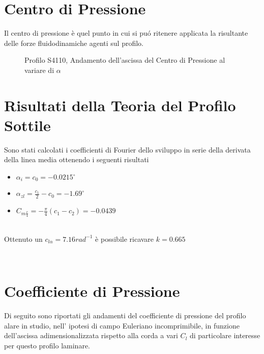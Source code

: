 \section{Centro di Pressione}

Il centro di pressione è quel punto in cui si puó ritenere applicata la risultante delle forze fluidodinamiche agenti sul profilo.\\

\begin{figure} [H]
\centering
{}
\caption{\footnotesize Profilo S4110, Andamento dell'ascissa del Centro di Pressione al variare di ${\alpha}$ }\label{fig:cp}
\end{figure}


\section{Risultati della Teoria del Profilo Sottile}

Sono stati calcolati i coefficienti di Fourier dello sviluppo in serie della derivata della linea media ottenendo i seguenti risultati


\begin {itemize}
\item ${\alpha}_i=c_0=-0.0215^\circ$
\item ${\alpha}_{zl}=\frac {c_1}{2}-c_0=-1.69^\circ$
\item $C_{m\frac {c}{4}}=-\frac {{\pi}}{4}(c_1-c_2)=-0.0439$
\end{itemize}

\noindent \\ 
Ottenuto un $c_{l{\alpha}} = 7.16 rad^{-1}$  è possibile ricavare $ k=0.665$

\noindent \\
\section{Coefficiente di Pressione}

Di seguito sono riportati gli andamenti del coefficiente di pressione del profilo alare in studio, nell’ ipotesi di campo Euleriano incomprimibile, in funzione dell’ascissa adimensionalizzata rispetto alla corda a vari $C_l$ di particolare interesse per questo profilo laminare.


